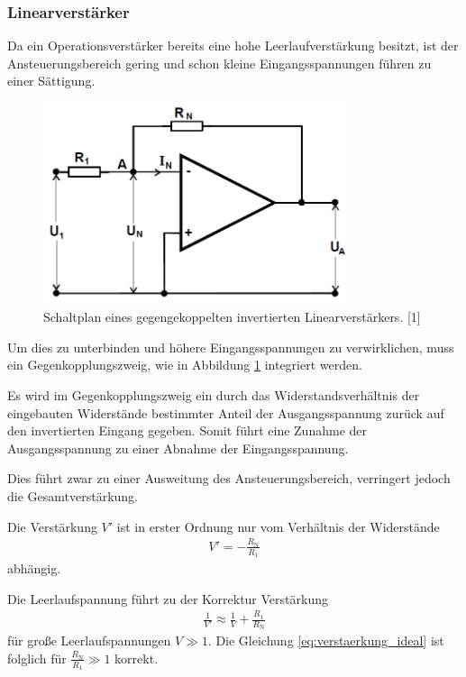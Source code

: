 \documentclass[]{scrartcl}
\begin{document}
\subsubsection{Linearverstärker}
Da ein Operationsverstärker bereits eine hohe Leerlaufverstärkung besitzt, ist der Ansteuerungsbereich gering und schon kleine Eingangsspannungen führen zu einer Sättigung.
\begin{figure}[H]
\centering
\includegraphics[width=9cm]{images/schaltplan_linearverstaerker.png}
\caption{Schaltplan eines gegengekoppelten invertierten Linearverstärkers. [1]}
\label{fig:schaltplan_linearverstaerker}
\end{figure}
Um dies zu unterbinden und höhere Eingangsspannungen zu verwirklichen, muss ein Gegenkopplungszweig, wie in Abbildung \ref{fig:schaltplan_linearverstaerker} integriert werden.

Es wird im Gegenkopplungszweig ein durch das Widerstandsverhältnis der eingebauten Widerstände bestimmter Anteil der Ausgangsspannung zurück auf den invertierten Eingang gegeben. Somit führt eine Zunahme der Ausgangsspannung zu einer Abnahme der Eingangsspannung.

Dies führt zwar zu einer Ausweitung des Ansteuerungsbereich, verringert jedoch die Gesamtverstärkung.

Die Verstärkung $V'$ ist in erster Ordnung nur vom Verhältnis der Widerstände
\begin{align}
V'=-\frac{R_{\text{N}}}{R_{1}}
\label{eq:verstaerkung_ideal}
\end{align}
abhängig.

Die Leerlaufspannung führt zu der Korrektur Verstärkung
\begin{align}
\frac{1}{V'}\approx \frac{1}{V} + \frac{R_{1}}{R_{\text{N}}}
\end{align}
für große Leerlaufspannungen $V \gg 1$. Die Gleichung \ref{eq:verstaerkung_ideal} ist folglich für $\frac{R_{\text{N}}}{R_{1}} \gg 1$ korrekt.
\end{document}
